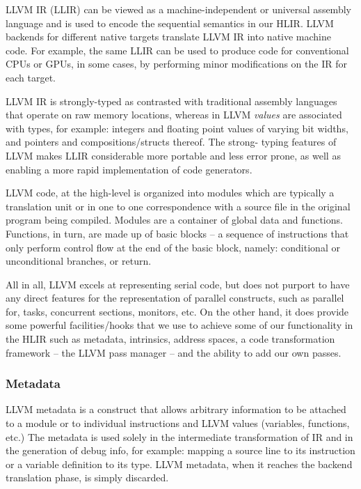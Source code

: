\documentclass[12pt]{article}
\begin{document}
LLVM IR (LLIR) can be viewed as a machine-independent or universal assembly language and is used to encode the sequential semantics in our HLIR. LLVM backends for different native targets translate LLVM IR into native machine code. For example, the same LLIR can be used to produce code for conventional CPUs or GPUs, in some cases, by performing minor modifications on the IR for each target.

LLVM IR is strongly-typed as contrasted with traditional assembly languages that operate on raw memory locations, whereas in LLVM {\it values} are associated with types, for example: integers and floating point values of varying bit widths, and pointers and compositions/structs thereof. The strong- typing features of LLVM makes LLIR considerable more portable and less error prone, as well as enabling a more rapid implementation of code generators.

LLVM code, at the high-level is organized into modules which are typically a translation unit or in one to one correspondence with a source file in the original program being compiled. Modules are a container of global data and functions. Functions, in turn, are made up of basic blocks -- a sequence of instructions that only perform control flow at the end of the basic block, namely: conditional or unconditional branches, or return.

All in all, LLVM excels at representing serial code, but does not purport to have any direct features for the representation of parallel constructs, such as parallel for, tasks, concurrent sections, monitors, etc. On the other hand, it does provide some powerful facilities/hooks that we use to achieve some of our functionality in the HLIR such as metadata, intrinsics, address spaces, a code transformation framework -- the LLVM pass manager -- and the ability to add our own passes.

\subsubsection{Metadata}

LLVM metadata is a construct that allows arbitrary information to be attached to a module or to individual instructions and LLVM values (variables, functions, etc.) The metadata is used solely in the intermediate transformation of IR and in the generation of debug info, for example: mapping a source line to its instruction or a variable definition to its type. LLVM metadata, when it reaches the backend translation phase, is simply discarded.
\end{document}
